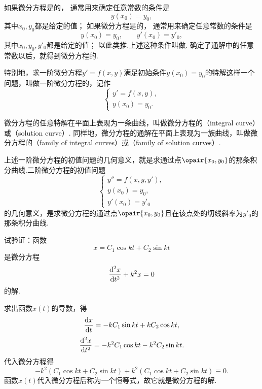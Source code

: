 如果微分方程是的，%
通常用来确定任意常数的条件是\[
y(x_0) = y_0,
\]其中\(x_0,y_0\)都是给定的值；
如果微分方程是的，%
通常用来确定任意常数的条件是\[
y(x_0) = y_0,
\qquad
y'(x_0) = y'_0,
\]其中\(x_0,y_0,y'_0\)都是给定的值；
以此类推.上述这种条件叫做.
确定了通解中的任意常数以后，就得到微分方程的.

特别地，求一阶微分方程\(y'=f(x,y)\)满足初始条件\(y(x_0) = y_0\)的特解这样一个问题，叫做一阶微分方程的，记作\[
\left\{ \begin{array}{l}
y' = f(x,y), \\
y(x_0) = y_0.
\end{array} \right.
\]

微分方程的任意特解在平面上表现为一条曲线，叫做微分方程的（integral curve）或（solution curve）.
同样地，微分方程的通解在平面上表现为一族曲线，叫做微分方程的（family of integral curves）或（family of solution curves）.

上述一阶微分方程的初值问题的几何意义，就是求通过点\(\opair{x_0,y_0}\)的那条积分曲线.二阶微分方程的初值问题\[
\left\{ \begin{array}{l}
y'' = f(x,y,y'), \\
y(x_0) = y_0, \\
y'(x_0) = y'_0
\end{array} \right.
\]的几何意义，是求微分方程的通过点\(\opair{x_0,y_0}\)且在该点处的切线斜率为\(y'_0\)的那条积分曲线.

\begin{example}
试验证：函数\[
x = C_1 \cos kt + C_2 \sin kt
\]是微分方程\[
\dv[2]{x}{t} + k^2 x = 0
\]的解.
\begin{solution}
求出函数\(x(t)\)的导数，得\[
\dv{x}{t} = -k C_1 \sin kt + k C_2 \cos kt,
\]\[
\dv[2]{x}{t} = -k^2 C_1 \cos kt - k^2 C_2 \sin kt.
\]代入微分方程得\[
-k^2 (C_1 \cos kt + C_2 \sin kt) + k^2 (C_1 \cos kt + C_2 \sin kt)
\equiv 0.
\]
函数\(x(t)\)代入微分方程后称为一个恒等式，故它就是微分方程的解.
\end{solution}
\end{example}

